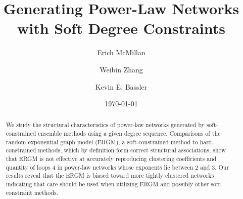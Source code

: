 \documentclass[aip,graphicx,amsmath]{revtex4-1}
\begin{document}

\title{Generating Power-Law Networks with Soft Degree Constraints} %

\author{Erich McMillan}
\author{Weibin Zhang}
\author{Kevin E. Bassler}


\date{\today}

\begin{abstract}
	We study the structural characteristics of power-law networks generated by soft-constrained ensemble methods using a given degree sequence. Comparisons of the random exponential graph model (ERGM), a soft-constrained method to hard-constrained methods, which by definition form correct structural associations, show that ERGM is not effective at accurately reproducing clustering coefficients and quantity of loops 4 in power-law networks whose exponents lie between 2 and 3. Our results reveal that the ERGM is biased toward more tightly clustered networks indicating that care should be used when utilizing ERGM and possibly other soft-constraint methods.
\end{abstract}

\pacs{}%

\maketitle %
\end{document}
